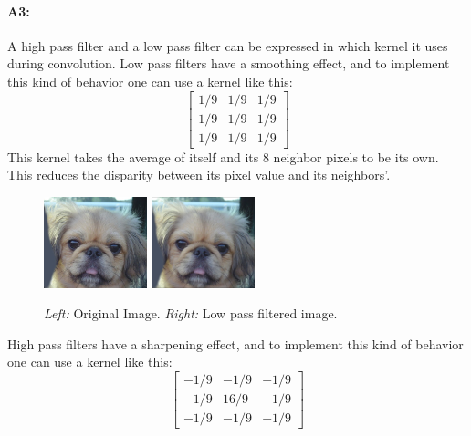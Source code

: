 	\paragraph{A3:}
    A high pass filter and a low pass filter can be expressed in which kernel it uses during convolution. Low pass filters have a smoothing effect, and to implement this kind of behavior one can use a kernel like this:
    \begin{equation}
        \begin{bmatrix}
            1/9 & 1/9 & 1/9 \\
            1/9 & 1/9 & 1/9 \\
            1/9 & 1/9 & 1/9
        \end{bmatrix}
    \end{equation}
    This kernel takes the average of itself and its 8 neighbor pixels to be its own. This reduces the disparity between its pixel value and its neighbors'.
    \begin{figure}[h]
        \centering
        \includegraphics[width=3cm]{original.jpg}
        \includegraphics[width=3cm]{lowpass.jpg}
        \caption{\emph{Left:} Original Image. \emph{Right:} Low pass filtered image.}
    \end{figure}


    High pass filters have a sharpening effect, and to implement this kind of behavior one can use a kernel like this:
    \begin{equation}
        \begin{bmatrix}
            -1/9 & -1/9 & -1/9 \\
            -1/9 & 16/9 & -1/9 \\
            -1/9 & -1/9 & -1/9
        \end{bmatrix}
    \end{equation}

